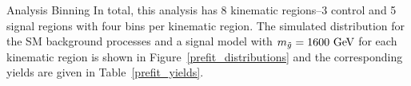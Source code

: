 \begin{section}{Analysis Binning}
In total, this analysis has 8 kinematic regions--3 control and 5 signal regions with four \Nb bins per kinematic region.
The simulated \Nb distribution for the SM background processes and a signal model with $m_{\tilde{g}} = 1600~\mathrm{Ge\kern -0.1em V}$ for each kinematic region is shown in Figure~\ref{prefit_distributions} and the corresponding yields are given in Table~\ref{prefit_yields}.

\end{section}

